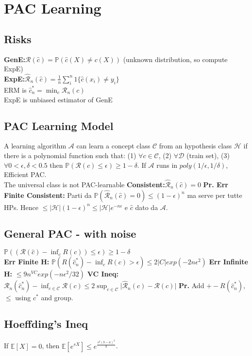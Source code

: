 \section*{PAC Learning}
\subsection*{Risks}
\textbf{GenE:}$\mathcal{R}(\hat c)=\mathbb{P}(\hat{c}(X)\ne c(X))$ (unknown distribution, so compute ExpE)\\
\textbf{ExpE:}$\mathcal{\hat R}_n(\hat c)=\frac{1}{n}\sum^n_i1\{\hat c(x_i)\ne y_i\}$\\
ERM is $\hat c_{n}^*=\min_c \hat{\mathcal R_n}(c)$\\
ExpE is unbiased estimator of GenE
\subsection*{PAC Learning Model}
A learning algorithm $\mathcal A$ can learn a concept class $\mathcal C$ from an hypothesis class $\mathcal H$ if there is a polynomial function such that: (1) $\forall c\in\mathcal C$, (2) $\forall\mathcal D$ (train set), (3) $\forall 0<\epsilon,\delta<0.5$ then $\mathbb{P}(\mathcal R(c)\le\epsilon)\ge 1-\delta$. If $\mathcal A$ runs in $poly(1/\epsilon,1/\delta)$, Efficient PAC.\\
The universal class is not PAC-learnable
\textbf{Consistent:}$\mathcal{\hat R}_n(\hat c)=0$
\textbf{Pr. Err Finite Consistent:} Parti da $\mathbb{P}(\mathcal {\hat R}_n(\hat c)=0)\le (1-\epsilon)^n$ ma serve per tutte HPs. Hence $\le |\mathcal H|(1-\epsilon)^n\le|\mathcal H|e^{-n\epsilon}$ e $\hat c$ dato da $\mathcal A$.
\subsection*{General PAC - with noise}
$\mathbb{P}((\mathcal R(\hat c)-\inf_c R(c))\le\epsilon)\ge 1-\delta$\\
\textbf{Err Finite H:} $\mathbb{P}(R(\hat c_n^*)-\inf_cR(c)>\epsilon)\le 2|C|exp(-2n\epsilon^2)$
\textbf{Err Infinite H:} $\le 9n^{VC}exp(-n\epsilon^2/32)$
\textbf{VC Ineq:} $\mathcal{R}_n(\hat{c}_n^*)-\inf_{c\in\mathcal{C}}\mathcal{R}(c) \leq 2\sup_{c\in\mathcal{C}}\lvert \hat{\mathcal{R}}_n(c) - \mathcal{R}(c) \rvert$ \textbf{Pr.} Add $\mathcal +-R(\hat c_n^*)$, $\le$ using $c^*$ and group.
\subsection*{Hoeffding's Ineq}
If $\mathbb{E}[X]=0$, then $\mathbb{E}[e^{sX}]\le e^{\frac{s^2(b-a)^2}{8}}$.
